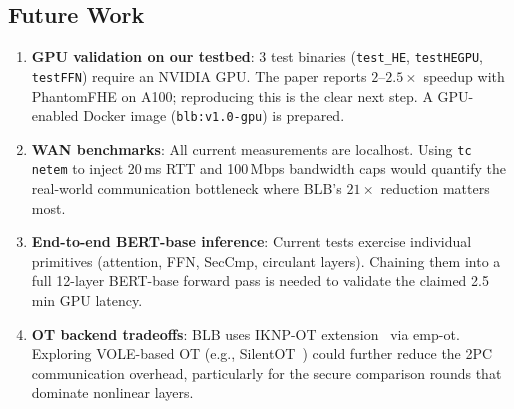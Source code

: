 \subsection{Future Work}

\begin{enumerate}[nosep]
  \item \textbf{GPU validation on our testbed}: 3 test binaries (\texttt{test\_HE}, \texttt{testHEGPU}, \texttt{testFFN}) require an NVIDIA GPU. The paper reports $2$--$2.5\times$ speedup with PhantomFHE on A100; reproducing this is the clear next step. A GPU-enabled Docker image (\texttt{blb:v1.0-gpu}) is prepared.
  \item \textbf{WAN benchmarks}: All current measurements are localhost. Using \texttt{tc netem} to inject 20\,ms RTT and 100\,Mbps bandwidth caps would quantify the real-world communication bottleneck where BLB's $21\times$ reduction matters most.
  \item \textbf{End-to-end BERT-base inference}: Current tests exercise individual primitives (attention, FFN, SecCmp, circulant layers). Chaining them into a full 12-layer BERT-base forward pass is needed to validate the claimed 2.5\,min GPU latency.
  \item \textbf{OT backend tradeoffs}: BLB uses IKNP-OT extension~\cite{iknp2003} via emp-ot. Exploring VOLE-based OT (e.g., SilentOT~\cite{boyle2019silentot}) could further reduce the 2PC communication overhead, particularly for the secure comparison rounds that dominate nonlinear layers.
\end{enumerate}

